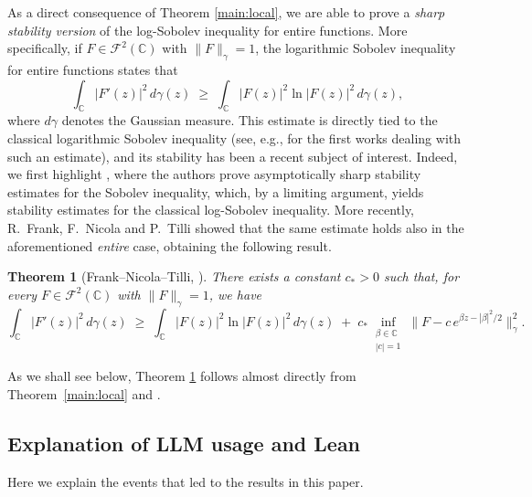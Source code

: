 \documentclass[11pt]{amsart}
\newtheorem{theorem}{Theorem}[section]
\theoremstyle{remark}
\newtheorem{remark}[theorem]{Remark}
\begin{document}
As a direct consequence of Theorem \ref{main:local}, we are able to prove a \emph{sharp stability version} of the log-Sobolev inequality for entire functions. More specifically, if $F \in \mathcal{F}^2(\mathbb{C})$ with $\|F\|_{\gamma}= 1$, the logarithmic Sobolev inequality for entire functions states that 
\[
 \int_{\mathbb{C}} |F'(z)|^2 \, d\gamma(z)
  \;\ge\;
  \int_{\mathbb{C}} |F(z)|^2 \ln |F(z)|^2 \, d\gamma(z),
\]
where $d\gamma$ denotes the Gaussian measure. This estimate is directly tied to the classical logarithmic Sobolev inequality (see, e.g., \cite{Gross1975,Stam1959,Weissler1978} for the first works dealing with such an estimate), and its stability has been a recent subject of interest. Indeed, we first highlight \cite{DolbeaultEstebanFigalliFrankLoss2025}, where the authors prove asymptotically sharp stability estimates for the Sobolev inequality, which, by a limiting argument, yields stability estimates for the classical log-Sobolev inequality. More recently, R.~Frank, F.~Nicola and P.~Tilli \cite{FrankNicolaTilli2025} showed that the same estimate holds also in the aforementioned \emph{entire} case, obtaining the following result. 
\begin{theorem}[Frank--Nicola--Tilli, {\cite[Theorem~14]{FrankNicolaTilli2025}}]\label{thm:FNTLogSob}
There exists a constant $c_\ast > 0$ such that, for every
$F \in \mathcal{F}^2(\mathbb{C})$ with $\|F\|_{\gamma} = 1$, we have
\begin{equation*}
  \int_{\mathbb{C}} |F'(z)|^2 \, d\gamma(z)
  \;\ge\;
  \int_{\mathbb{C}} |F(z)|^2 \ln |F(z)|^2 \, d\gamma(z)
  \;+\;
  c_\ast \!\!\inf_{\substack{\beta \in \mathbb{C} \\ |c|=1}}\!
  \bigl\| F - c\, e^{\beta z - |\beta|^2/2} \bigr\|_{\gamma}^{2}.
\end{equation*}

\end{theorem}

As we shall see below, Theorem \ref{thm:FNTLogSob} follows almost directly from Theorem~\ref{main:local} and \cite[Corollary~1.2]{DolbeaultEstebanFigalliFrankLoss2025}. 


\subsection{Explanation of LLM usage and Lean}\label{LLM Sect}
Here we explain the events that led to the results in this paper.
 \vspace{0.5em}
\end{document}
